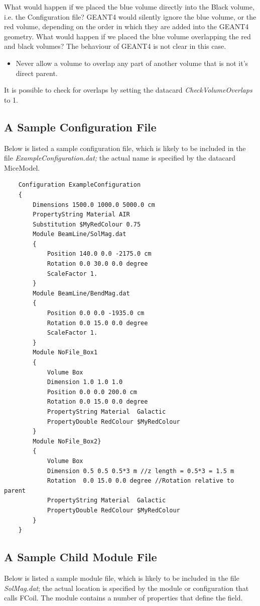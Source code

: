 What would happen if we placed the blue volume directly into the Black volume, i.e. the Configuration file? GEANT4 would
silently ignore the blue volume, or the red volume, depending on the order in which they are added into the GEANT4
geometry. What would happen if we placed the blue volume overlapping the red and black volumes? The behaviour of GEANT4
is not clear in this case.

\liststyleLiii
\begin{itemize}
\item Never allow a volume to overlap any part of another volume that is not it's direct parent.
\end{itemize}
It is possible to check for overlaps by setting the datacard \textit{CheckVolumeOverlaps} to 1.

\subsection{A Sample Configuration File}
Below is listed a sample configuration file, which is likely to be included in the file
\textit{ExampleConfiguration.dat;} the actual name is specified by the datacard MiceModel.
\begin{verbatim}
    Configuration ExampleConfiguration
    {
        Dimensions 1500.0 1000.0 5000.0 cm
        PropertyString Material AIR
        Substitution $MyRedColour 0.75
        Module BeamLine/SolMag.dat
        {
            Position 140.0 0.0 -2175.0 cm
            Rotation 0.0 30.0 0.0 degree
            ScaleFactor 1.
        }
        Module BeamLine/BendMag.dat
        {
            Position 0.0 0.0 -1935.0 cm
            Rotation 0.0 15.0 0.0 degree
            ScaleFactor 1.
        }
        Module NoFile_Box1
        {
            Volume Box
            Dimension 1.0 1.0 1.0
            Position 0.0 0.0 200.0 cm
            Rotation 0.0 15.0 0.0 degree
            PropertyString Material  Galactic
            PropertyDouble RedColour $MyRedColour
        }
        Module NoFile_Box2}
        {
            Volume Box
            Dimension 0.5 0.5 0.5*3 m //z length = 0.5*3 = 1.5 m
            Rotation  0.0 15.0 0.0 degree //Rotation relative to parent
            PropertyString Material  Galactic
            PropertyDouble RedColour $MyRedColour
        }
    }
\end{verbatim}

\subsection{A Sample Child Module File}
Below is listed a sample module file, which is likely to be included in the file \textit{SolMag.dat}; the actual
location is specified by the module or configuration that calls FCoil. The module contains a number of properties that
define the field.


